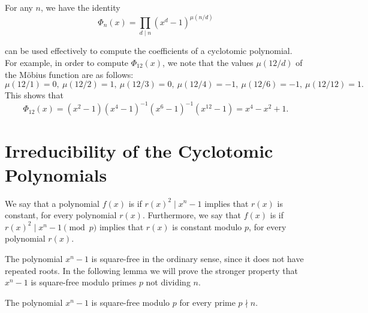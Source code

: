 \begin{theorem}\label{theorem:mobius-inversion-cyclotomic-polynomials}
  For any $n$, we have the identity
  \begin{equation*}
    \Phi_n(x)=\prod_{d\mid n}(x^d-1)^{\mu(n/d)}
  \end{equation*}
\end{theorem}

\begin{example}
   can be used effectively to compute the coefficients of a cyclotomic polynomial. For example, in order to compute $\Phi_{12}(x)$, we note that the values $\mu(12/d)$ of the M\"obius function are as follows:
  \begin{equation*}
    \mu(12/1)=0,~\mu(12/2)=1,~\mu(12/3)=0,~\mu(12/4)=-1,~\mu(12/6)=-1,~\mu(12/12)=1.
  \end{equation*}
  This shows that
  \begin{equation*}
    \Phi_{12}(x)=(x^2-1)(x^4-1)^{-1}(x^6-1)^{-1}(x^{12}-1)=x^4-x^2+1.
  \end{equation*}
\end{example}

\section{Irreducibility of the Cyclotomic Polynomials}

\begin{definition}
  We say that a polynomial $f(x)$ is  if $r(x)^2\mid x^n-1$ implies that $r(x)$ is constant, for every polynomial $r(x)$. Furthermore, we say that $f(x)$ is  if $r(x)^2\mid x^n-1 \pmod{p}$ implies that $r(x)$ is constant modulo $p$, for every polynomial $r(x)$.
\end{definition}

The polynomial $x^n-1$ is square-free in the ordinary sense, since it does not have repeated roots. In the following lemma we will prove the stronger property that $x^n-1$ is square-free modulo primes $p$ not dividing $n$.

\begin{lemma}
  The polynomial $x^n-1$ is square-free modulo $p$ for every prime $p\nmid n$.
\end{lemma}

